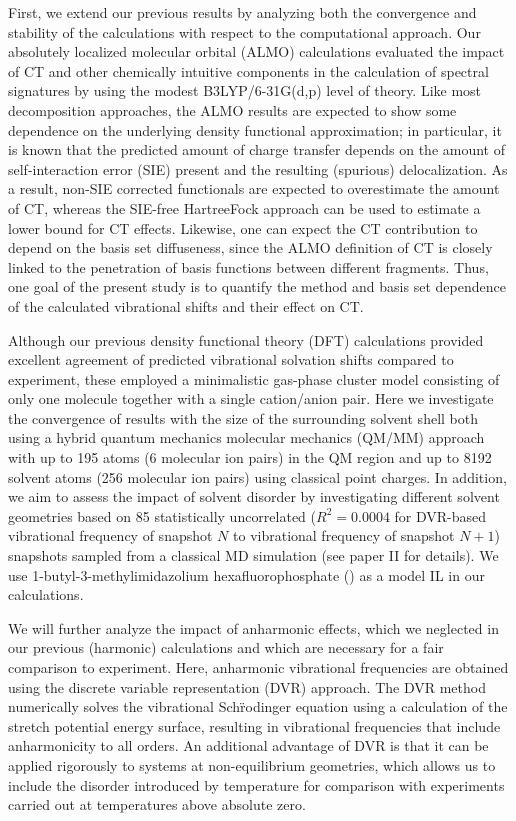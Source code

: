 \documentclass[%
  class = book,%
  crop = false,%
  float = true,%
  multi = true,%
  preview = false,%
]{standalone}
\let\cite\autocite
\begin{document}
First, we extend our previous results by analyzing both the convergence and stability of the calculations with respect to the computational approach. Our absolutely localized molecular orbital (ALMO) calculations\cite{Khaliullin2006,Khaliullin2007,Khaliullin2008} evaluated the impact of CT and other chemically intuitive components in the calculation of spectral signatures by using the modest B3LYP/6-31G(d,p) level of theory. Like most decomposition approaches, the ALMO results are expected to show some dependence on the underlying density functional approximation; in particular, it is known that the predicted amount of charge transfer depends on the amount of self-interaction error (SIE) present and the resulting (spurious) delocalization\cite{Ramos-Cordoba2011}. As a result, non-SIE corrected functionals are expected to overestimate the amount of CT, whereas the SIE-free Hartree\textendash{}Fock approach can be used to estimate a lower bound for CT effects. Likewise, one can expect the CT contribution to depend on the basis set diffuseness, since the ALMO definition of CT is closely linked to the penetration of basis functions between different fragments. Thus, one goal of the present study is to quantify the method and basis set dependence of the calculated vibrational shifts and their effect on CT.

Although our previous density functional theory (DFT) calculations provided excellent agreement of predicted vibrational solvation shifts compared to experiment, these employed a minimalistic gas-phase cluster model consisting of only one  molecule together with a single cation/anion pair. Here we investigate the convergence of results with the size of the surrounding solvent shell both using a hybrid quantum mechanics molecular mechanics (QM/MM) approach with up to \num{195} atoms (\num{6} molecular ion pairs) in the QM region and up to \num{8192} solvent atoms (\num{256} molecular ion pairs) using classical point charges. In addition, we aim to assess the impact of solvent disorder by investigating different solvent geometries based on \num{85} statistically uncorrelated (\(R^2 = 0.0004\) for DVR-based vibrational frequency of snapshot \(N\) to vibrational frequency of snapshot \(N+1\)) snapshots sampled from a classical MD simulation (see paper II\cite{Daly2016} for details). We use 1-butyl-3-methylimidazolium hexafluorophosphate (\ce{[C4C1im][PF6]}) as a model IL in our calculations.

We will further analyze the impact of anharmonic effects, which we neglected in our previous (harmonic) calculations and which are necessary for a fair comparison to experiment. Here, anharmonic vibrational frequencies are obtained using the discrete variable representation (DVR) approach. The DVR method numerically solves the vibrational Schr\"{}odinger equation using a calculation of the  stretch potential energy surface, resulting in vibrational frequencies that include anharmonicity to all orders. An additional advantage of DVR is that it can be applied rigorously to systems at non-equilibrium geometries, which allows us to include the disorder introduced by temperature for comparison with experiments carried out at temperatures above absolute zero.
\end{document}
